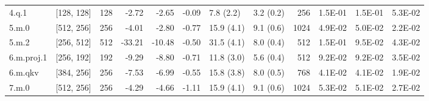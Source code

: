 \begin{table}
\begin{tabular}{llrrrrllrrrr}
4.q.1 & [128, 128] & 128 & {\cellcolor[HTML]{F1F9AC}} \color[HTML]{000000} -2.72 & {\cellcolor[HTML]{F1F9AC}} \color[HTML]{000000} -2.65 & {\cellcolor[HTML]{E9F6A1}} \color[HTML]{000000} -0.09 & 7.8 (2.2) & 3.2 (0.2) & 256 & {\cellcolor[HTML]{EE613E}} \color[HTML]{F1F1F1} 1.5E-01 & {\cellcolor[HTML]{EB5A3A}} \color[HTML]{F1F1F1} 1.5E-01 & {\cellcolor[HTML]{FBFDBA}} \color[HTML]{000000} 5.3E-02 \\
5.m.0 & [512, 256] & 256 & {\cellcolor[HTML]{F5FBB2}} \color[HTML]{000000} -4.01 & {\cellcolor[HTML]{F1F9AC}} \color[HTML]{000000} -2.80 & {\cellcolor[HTML]{ECF7A6}} \color[HTML]{000000} -0.77 & 15.9 (4.1) & 9.1 (0.6) & 1024 & {\cellcolor[HTML]{F5FBB2}} \color[HTML]{000000} 4.9E-02 & {\cellcolor[HTML]{F8FCB6}} \color[HTML]{000000} 5.0E-02 & {\cellcolor[HTML]{D3EC87}} \color[HTML]{000000} 2.2E-02 \\
5.m.2 & [256, 512] & 512 & {\cellcolor[HTML]{FDB567}} \color[HTML]{000000} -33.21 & {\cellcolor[HTML]{FFF8B4}} \color[HTML]{000000} -10.48 & {\cellcolor[HTML]{EBF7A3}} \color[HTML]{000000} -0.50 & 31.5 (4.1) & 8.0 (0.4) & 512 & {\cellcolor[HTML]{EB5A3A}} \color[HTML]{F1F1F1} 1.5E-01 & {\cellcolor[HTML]{FECE7C}} \color[HTML]{000000} 9.5E-02 & {\cellcolor[HTML]{EEF8A8}} \color[HTML]{000000} 4.3E-02 \\
6.m.proj.1 & [256, 192] & 192 & {\cellcolor[HTML]{FFFCBA}} \color[HTML]{000000} -9.29 & {\cellcolor[HTML]{FFFDBC}} \color[HTML]{000000} -8.80 & {\cellcolor[HTML]{EBF7A3}} \color[HTML]{000000} -0.71 & 11.8 (3.0) & 5.6 (0.4) & 512 & {\cellcolor[HTML]{FED27F}} \color[HTML]{000000} 9.2E-02 & {\cellcolor[HTML]{FED481}} \color[HTML]{000000} 9.2E-02 & {\cellcolor[HTML]{E5F49B}} \color[HTML]{000000} 3.5E-02 \\
6.m.qkv & [384, 256] & 256 & {\cellcolor[HTML]{FEFFBE}} \color[HTML]{000000} -7.53 & {\cellcolor[HTML]{FDFEBC}} \color[HTML]{000000} -6.99 & {\cellcolor[HTML]{EBF7A3}} \color[HTML]{000000} -0.55 & 15.8 (3.8) & 8.0 (0.5) & 768 & {\cellcolor[HTML]{ECF7A6}} \color[HTML]{000000} 4.1E-02 & {\cellcolor[HTML]{ECF7A6}} \color[HTML]{000000} 4.1E-02 & {\cellcolor[HTML]{CBE982}} \color[HTML]{000000} 1.9E-02 \\
7.m.0 & [512, 256] & 256 & {\cellcolor[HTML]{F5FBB2}} \color[HTML]{000000} -4.29 & {\cellcolor[HTML]{F7FCB4}} \color[HTML]{000000} -4.66 & {\cellcolor[HTML]{ECF7A6}} \color[HTML]{000000} -1.11 & 15.9 (4.1) & 9.1 (0.6) & 1024 & {\cellcolor[HTML]{FBFDBA}} \color[HTML]{000000} 5.3E-02 & {\cellcolor[HTML]{FAFDB8}} \color[HTML]{000000} 5.1E-02 & {\cellcolor[HTML]{DAF08D}} \color[HTML]{000000} 2.7E-02 \\

\end{tabular}
\end{table}
